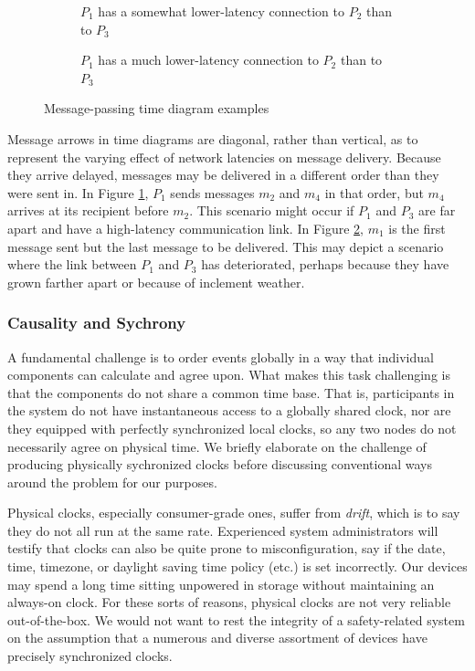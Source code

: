 \documentclass[]             %
{NASA}                       %
\theoremstyle{definition}
\begin{document}
\begin{figure}[p]
  \setlength\belowcaptionskip{5ex}
  \begin{subfigure}{1\textwidth}
    \centering
    
    \caption{$P_1$ has a somewhat lower-latency connection to $P_2$ than to $P_3$}
    \label{fig:message-latencies-a}
  \end{subfigure}
  \begin{subfigure}{1\textwidth}
    \centering 
    \caption{$P_1$ has a much lower-latency connection to $P_2$ than to $P_3$}
    \label{fig:message-latencies-b}
  \end{subfigure}
  \caption{Message-passing time diagram examples}
  \label{fig:message-latencies}
\end{figure}

Message arrows in time diagrams are diagonal, rather than vertical, as
to represent the varying effect of network latencies on message
delivery. Because they arrive delayed, messages may be delivered in a
different order than they were sent in. In Figure
\ref{fig:message-latencies-a}, $P_1$ sends messages $m_2$ and $m_4$ in
that order, but $m_4$ arrives at its recipient before $m_2$. This
scenario might occur if $P_1$ and $P_3$ are far apart and have a
high-latency communication link. In Figure
\ref{fig:message-latencies-b}, $m_1$ is the first message sent but the
last message to be delivered. This may depict a scenario where the
link between $P_1$ and $P_3$ has deteriorated, perhaps because they
have grown farther apart or because of inclement weather.

\subsubsection{Causality and  Sychrony}
\label{ssec:causality}
A fundamental challenge is to order events globally in a way that
individual components can calculate and agree upon. What makes this
task challenging is that the components do not share a common time
base. That is, participants in the system do not have instantaneous
access to a globally shared clock, nor are they equipped with
perfectly synchronized local clocks, so any two nodes do not
necessarily agree on physical time. We briefly elaborate on the
challenge of producing physically sychronized clocks before discussing
conventional ways around the problem for our purposes.

Physical clocks, especially consumer-grade ones, suffer from
\emph{drift}, which is to say they do not all run at the same
rate. Experienced system administrators will testify that clocks can
also be quite prone to misconfiguration, say if the date, time,
timezone, or daylight saving time policy (etc.) is set
incorrectly. Our devices may spend a long time sitting unpowered in
storage without maintaining an always-on clock. For these sorts of
reasons, physical clocks are not very reliable out-of-the-box. We
would not want to rest the integrity of a safety-related system on the
assumption that a numerous and diverse assortment of devices have
precisely synchronized clocks.
\end{document}
